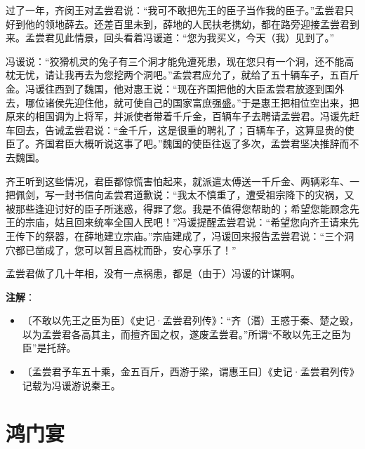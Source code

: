 \documentclass[12pt,UTF-8,openany]{ctexbook}
\begin{document}
\begin{normalsize}
    过了一年，齐闵王对孟尝君说：“我可不敢把先王的臣子当作我的臣子。”孟尝君只好到他的领地薛去。还差百里未到，薛地的人民扶老携幼，都在路旁迎接孟尝君到来。孟尝君见此情景，回头看着冯谖道：“您为我买义，今天（我）见到了。”
    
    冯谖说：“狡猾机灵的兔子有三个洞才能免遭死患，现在您只有一个洞，还不能高枕无忧，请让我再去为您挖两个洞吧。”孟尝君应允了，就给了五十辆车子，五百斤金。冯谖往西到了魏国，他对惠王说：“现在齐国把他的大臣孟尝君放逐到国外去，哪位诸侯先迎住他，就可使自己的国家富庶强盛。”于是惠王把相位空出来，把原来的相国调为上将军，并派使者带着千斤金，百辆车子去聘请孟尝君。冯谖先赶车回去，告诫孟尝君说：“金千斤，这是很重的聘礼了；百辆车子，这算显贵的使臣了。齐国君臣大概听说这事了吧。”魏国的使臣往返了多次，孟尝君坚决推辞而不去魏国。
    
    齐王听到这些情况，君臣都惊慌害怕起来，就派遣太傅送一千斤金、两辆彩车、一把佩剑，写一封书信向孟尝君道歉说：“我太不慎重了，遭受祖宗降下的灾祸，又被那些逢迎讨好的臣子所迷惑，得罪了您。我是不值得您帮助的；希望您能顾念先王的宗庙，姑且回来统率全国人民吧！”冯谖提醒孟尝君说：“希望您向齐王请来先王传下的祭器，在薛地建立宗庙。”宗庙建成了，冯谖回来报告孟尝君说：“三个洞穴都已凿成了，您可以暂且高枕而卧，安心享乐了！”
    
    孟尝君做了几十年相，没有一点祸患，都是（由于）冯谖的计谋啊。
    
\end{normalsize}


\newpage

\textbf{注解}：

\vspace{-1em}

\begin{itemize}
    \setlength\itemsep{-0.2em}
    \item〔不敢以先王之臣为臣〕《史记·孟尝君列传》：“齐（湣）王惑于秦、楚之毁，以为孟尝君各高其主，而擅齐国之权，遂废孟尝君。”所谓“不敢以先王之臣为臣”是托辞。
    \item〔孟尝君予车五十乘，金五百斤，西游于梁，谓惠王曰〕《史记·孟尝君列传》记载为冯谖游说秦王。
\end{itemize}

\chapter{鸿门宴}
\end{document}
